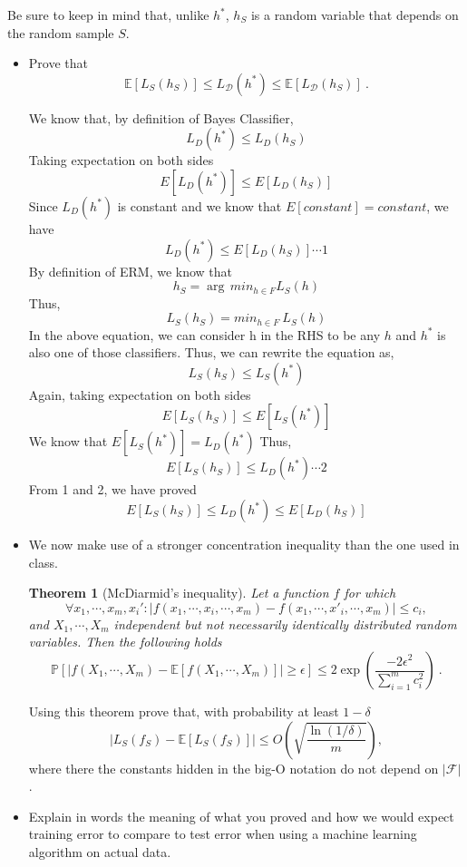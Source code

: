 \documentclass{article}
\newtheorem{theorem}{Theorem}
\newcommand{\field}[1]{\mathbb{#1}}
\newcommand{\set}[1]{\mathcal{#1}}
\newcommand{\fF}{\set{F}}
\newcommand{\fD}{\set{D}}
\renewcommand{\Pr}{\field{P}}
\newcommand{\E}{\field{E}}
\newcommand{\RiskD}{L_{\fD}}
\newcommand{\RiskS}{L_{S}}
\begin{document}
Be sure to keep in mind that, unlike $h^*$, $h_S$ is a random variable that depends on the random sample $S$.
\begin{itemize}
\item Prove that
\[
\E[\RiskS(h_S)]\leq \RiskD(h^*) \leq \E[\RiskD(h_S)]~.
\]
\begin{mdframed}[backgroundcolor=lightgray]
We know that, by definition of Bayes Classifier,
$$ L_{D}(h^{*}) \leq L_D(h_S)$$
Taking expectation on both sides
$$ E[L_{D}(h^{*})] \leq E[L_D(h_S)]$$
Since $L_{D}(h^{*})$ is constant and we know that $E[constant] = constant$, we have
$$ L_{D}(h^{*}) \leq E[L_D(h_S)] \cdots 1$$
By definition of ERM, we know that
$$ h_S = \arg\,min_{h\in F}  L_S(h)$$
Thus,
$$L_{S}(h_{S}) = min_{h\in F}\ L_{S}(h)$$
In the above equation, we can consider h in the RHS to be any $h$ and $h^*$ is also one of those classifiers. Thus, we can rewrite the equation as,
$$L_{S}(h_{S}) \leq  L_{S}(h^*)$$
Again, taking expectation on both sides
$$E[L_{S}(h_{S})] \leq E[L_{S}(h^{*})] $$
We know that $E[L_{S}(h^*)] = L_{D}(h^*) $ Thus,
$$E[L_{S}(h_{S})] \leq  L_{D}(h^*) \cdots 2$$
From 1 and 2, we have proved
$$E[L_{S}(h_{S})] \leq L_{D}(h^{*}) \leq E[L_D(h_S)]$$
\end{mdframed}

\item We now make use of a stronger concentration inequality than the one used in class.
\begin{theorem}[McDiarmid’s inequality]
Let a function $f$ for which
\[
\forall x_1, \cdots, x_m, x_i' : |f(x_1,\cdots,x_i,\cdots,x_m)-f(x_1,\cdots,x'_i,\cdots,x_m)| \leq c_i,
\]
and $X_1,\cdots, X_m$ independent but not necessarily identically distributed random variables.
Then the following holds
\[
\Pr\left[\left|f(X_1, \cdots, X_m)- \E\left[f(X_1, \cdots, X_m)\right]\right|\geq\epsilon\right]\leq 2\exp\left(\frac{-2 \epsilon^2}{\sum_{i=1}^m c_i^2}\right)~.
\]
\end{theorem}
Using this theorem prove that, with probability at least $1-\delta$
\[
|\RiskS(f_S)-\E[\RiskS(f_S)]|\leq O\left(\sqrt{\frac{\ln(1/\delta)}{m}}\right),
\]
where there the constants hidden in the big-O notation do not depend on $|\fF|$.
\item Explain in words the meaning of what you proved and how we would expect training error to compare to test error when using a machine learning algorithm on actual data.
\end{itemize}
\end{document}
